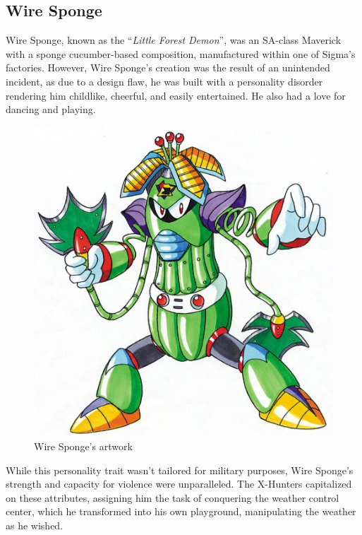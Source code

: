 \subsection{Wire Sponge}\label{boss:Wire_sponge}
Wire Sponge, known as the ``\textit{Little Forest Demon}''\cite{book:MMX_Complete_art}, was an SA-class Maverick with a sponge cucumber-based composition, manufactured within one of Sigma's factories. However, Wire Sponge's creation was the result of an unintended incident, as due to a design flaw, he was built with a personality disorder rendering him childlike, cheerful, and easily entertained. He also had a love for dancing and playing.
\begin{figure}[htp]
	\centering
	\includegraphics[height=\portraitsize]{figures/X2/Wire_sponge/Wire_Sponge.png}
	\caption{Wire Sponge's artwork~\cite{book:MMX_Complete_art}}
\end{figure}
 While this personality trait wasn't tailored for military purposes, Wire Sponge's strength and capacity for violence were unparalleled. The X-Hunters capitalized on these attributes, assigning him the task of conquering the weather control center, which he transformed into his own playground, manipulating the weather as he wished\cite{wiki:wire_sponge,wayback:X2_resources}.

